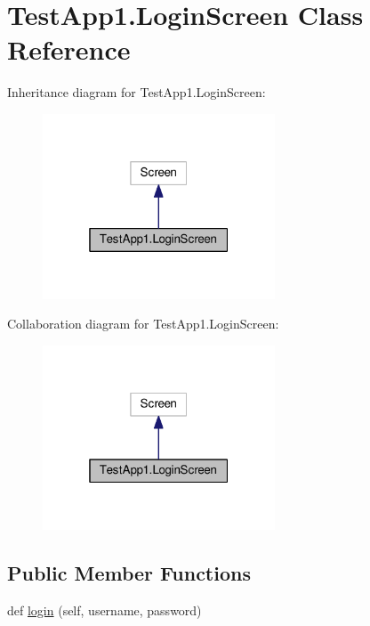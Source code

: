 \hypertarget{classTestApp1_1_1LoginScreen}{}\section{Test\+App1.\+Login\+Screen Class Reference}
\label{classTestApp1_1_1LoginScreen}


Inheritance diagram for Test\+App1.\+Login\+Screen\+:\nopagebreak
\begin{figure}[H]
\begin{center}
\leavevmode
\includegraphics[width=196pt]{classTestApp1_1_1LoginScreen__inherit__graph}
\end{center}
\end{figure}


Collaboration diagram for Test\+App1.\+Login\+Screen\+:\nopagebreak
\begin{figure}[H]
\begin{center}
\leavevmode
\includegraphics[width=196pt]{classTestApp1_1_1LoginScreen__coll__graph}
\end{center}
\end{figure}
\subsection*{Public Member Functions}
\begin{DoxyCompactItemize}
\item 
def \hyperlink{classTestApp1_1_1LoginScreen_a112fceb7785f8596158f842d5c223936}{login} (self, username, password)
\end{DoxyCompactItemize}
